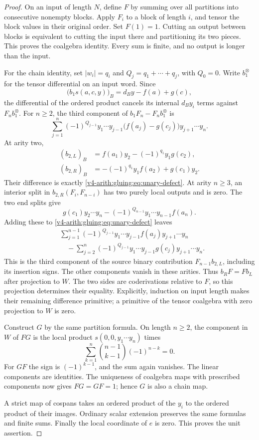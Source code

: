 \begin{proof}
On an input of length \(N\), define \(F\) by summing over all partitions
into consecutive nonempty blocks. Apply \(F_i\) to a block of length
\(i\), and tensor the block values in their original order. Set
\(F(1)=1\). Cutting an output between blocks is equivalent to cutting
the input there and partitioning its two pieces. This proves the
coalgebra identity. Every sum is finite, and no output is longer than
the input.

For the chain identity, set \(|w_i|=q_i\) and
\(Q_j=q_1+\cdots+q_j\), with \(Q_0=0\). Write \(b_1^{\otimes}\)
for the tensor differential on an input word. Since
\[
 \bigl(b_1s(a,c,y)\bigr)_B=d_By-f(a)+g(c),
\]
the differential of the ordered product cancels its internal
\(d_By_i\) terms against \(F_nb_1^{\otimes}\). For \(n\geq2\), the
third component of \(b_1F_n-F_nb_1^{\otimes}\) is
\begin{equation}\label{v4-arith:gluing:eq:unary-defect}
 \sum_{j=1}^n(-1)^{Q_{j-1}}
 y_1\cdots y_{j-1}\bigl(f(a_j)-g(c_j)\bigr)y_{j+1}\cdots y_n.
\end{equation}
At arity two,
\[
 \begin{split}
 (b_{2,L})_B&=f(a_1)y_2-(-1)^{q_1}y_1g(c_2),\\
 (b_{2,R})_B&=-(-1)^{q_1}y_1f(a_2)+g(c_1)y_2.
 \end{split}
\]
Their difference is exactly \eqref{v4-arith:gluing:eq:unary-defect}.
At arity \(n\geq3\), an interior split in
\(b_{2,R}(F_i,F_{n-i})\) has two purely local outputs and is zero.
The two end splits give
\[
 g(c_1)y_2\cdots y_n
       -(-1)^{Q_{n-1}}y_1\cdots y_{n-1}f(a_n).
\]
Adding these to \eqref{v4-arith:gluing:eq:unary-defect} leaves
\[
 \begin{split}
 &\sum_{j=1}^{n-1}(-1)^{Q_{j-1}}
       y_1\cdots y_{j-1}f(a_j)y_{j+1}\cdots y_n\\
 &\quad-\sum_{j=2}^{n}(-1)^{Q_{j-1}}
       y_1\cdots y_{j-1}g(c_j)y_{j+1}\cdots y_n.
 \end{split}
\]
This is the third component of the source binary contribution
\(F_{n-1}b_{2,L}\), including its insertion signs. The other components
vanish in these arities. Thus \(b_RF=Fb_L\) after projection to \(W\).
The two sides are coderivations relative to \(F\), so this projection
determines their equality. Explicitly, induction on input length makes
their remaining difference primitive; a primitive of the tensor
coalgebra with zero projection to \(W\) is zero.

Construct \(G\) by the same partition formula. On length \(n\geq2\),
the component in \(W\) of \(FG\) is the local product
\(s(0,0,y_1\cdots y_n)\) times
\[
 \sum_{k=1}^n\binom{n-1}{k-1}(-1)^{n-k}=0.
\]
For \(GF\) the sign is \((-1)^{k-1}\), and the sum again vanishes.
The linear components are identities. The uniqueness of coalgebra maps
with prescribed components now gives \(FG=GF=1\); hence \(G\) is also a
chain map.

A strict map of cospans takes an ordered product of the \(y_i\) to the
ordered product of their images. Ordinary scalar extension preserves
the same formulas and finite sums. Finally the local coordinate of
\(e\) is zero. This proves the unit assertion.
\end{proof}

